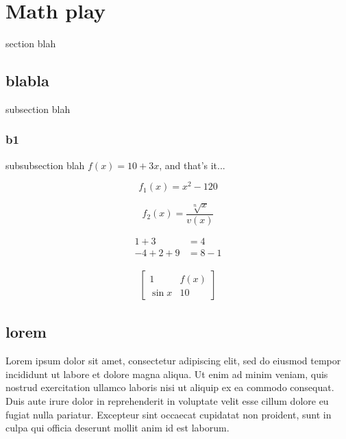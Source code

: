   \newpage
  \section{Math play}
    section blah

    \subsection{blabla}
      subsection blah

      \subsubsection{b1}
        subsubsection blah $f(x) = 10 + 3x$, and that's it...

        \begin{equation*}
          f_1(x) = x^2 - 120
        \end{equation*}

        \begin{equation*}
          f_2(x) = \frac{\sqrt[n]{x}}{v(x)}
        \end{equation*}

        \begin{align*}
               1 + 3 &= 4 \\
          -4 + 2 + 9 &= 8 - 1
        \end{align*}

        \begin{align*}
          \left[
          \begin{matrix}
                 1 & f(x) \\
            \sin x & 10
          \end{matrix}
          \right]
        \end{align*}

    \subsection{lorem}
      Lorem ipsum dolor sit amet, consectetur adipiscing elit, sed do eiusmod
      tempor incididunt ut labore et dolore magna aliqua. Ut enim ad minim
      veniam, quis nostrud exercitation ullamco laboris nisi ut aliquip ex ea
      commodo consequat. Duis aute irure dolor in reprehenderit in voluptate
      velit esse cillum dolore eu fugiat nulla pariatur. Excepteur sint
      occaecat cupidatat non proident, sunt in culpa qui officia deserunt
      mollit anim id est laborum.

